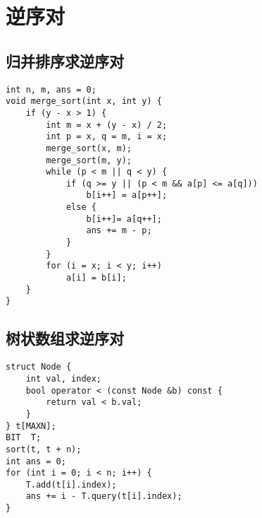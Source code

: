 \section{逆序对}
\subsection{归并排序求逆序对}
\begin{verbatim}
int n, m, ans = 0;
void merge_sort(int x, int y) {
    if (y - x > 1) {
        int m = x + (y - x) / 2;
        int p = x, q = m, i = x;
        merge_sort(x, m);
        merge_sort(m, y);
        while (p < m || q < y) {
            if (q >= y || (p < m && a[p] <= a[q]))
                b[i++] = a[p++];
            else {
                b[i++]= a[q++];
                ans += m - p;
            }
        }
        for (i = x; i < y; i++)
            a[i] = b[i];
    }
}
\end{verbatim}

\subsection{树状数组求逆序对}
\begin{verbatim}
struct Node {
    int val, index;
    bool operator < (const Node &b) const {
        return val < b.val;
    }
} t[MAXN];
BIT  T;
sort(t, t + n);
int ans = 0;
for (int i = 0; i < n; i++) {
    T.add(t[i].index);
    ans += i - T.query(t[i].index);
}
\end{verbatim}